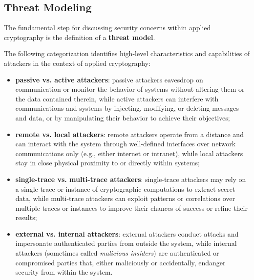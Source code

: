 \subsection{Threat Modeling}\label{sec:cryptographic_security_overview:threat_model}

The fundamental step for discussing security concerns within applied cryptography is the definition of a \textbf{threat model}.


The following categorization identifies high-level characteristics and capabilities of attackers in the context of applied cryptography:

\begin{itemize}
	\item \textbf{passive vs. active attackers}: passive attackers eavesdrop on communication or monitor the behavior of systems without altering them or the data contained therein, while active attackers can interfere with communications and systems by injecting, modifying, or deleting messages and data, or by manipulating their behavior to achieve their objectives;
	\item \textbf{remote vs. local attackers}: remote attackers operate from a distance and can interact with the system through well-defined interfaces over network communications only (e.g., either internet or intranet), while local attackers stay in close physical proximity to or directly within systems;
	\item \textbf{single-trace vs. multi-trace attackers}: single-trace attackers may rely on a single trace or instance of cryptographic computations to extract secret data, while multi-trace attackers can exploit patterns or correlations over multiple traces or instances to improve their chances of success or refine their results;
	\item \textbf{external vs. internal attackers}: external attackers conduct attacks and impersonate authenticated parties from outside the system, while internal attackers (sometimes called \textit{malicious insiders}) are authenticated or compromised parties that, either maliciously or accidentally, endanger security from within the system.
\end{itemize}

